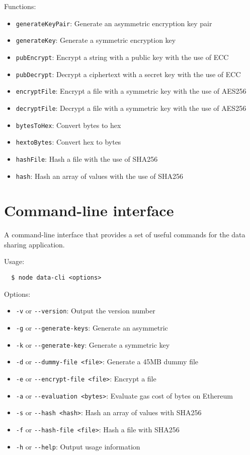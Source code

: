 Functions:

\begin{itemize}
  \item \verb|generateKeyPair|: Generate an asymmetric encryption key pair
  \item \verb|generateKey|: Generate a symmetric encryption key
  \item \verb|pubEncrypt|: Encrypt a string with a public key with the use of ECC
  \item \verb|pubDecrypt|: Decrypt a ciphertext with a secret key with the use of ECC
  \item \verb|encryptFile|: Encrypt a file with a symmetric key with the use of AES256
  \item \verb|decryptFile|: Decrypt a file with a symmetric key with the use of AES256
  \item \verb|bytesToHex|: Convert bytes to hex
  \item \verb|hextoBytes|: Convert hex to bytes
  \item \verb|hashFile|: Hash a file with the use of SHA256
  \item \verb|hash|: Hash an array of values with the use of SHA256
\end{itemize}

\section{Command-line interface}
\label{implemenation:cli}

A command-line interface that provides a set of useful commands for the data sharing application.

Usage:

\begin{verbatim}
  $ node data-cli <options>
\end{verbatim}

Options:

\begin{itemize}
  \item \verb|-v| or \verb|--version|: Output the version number
  \item \verb|-g| or \verb|--generate-keys|: Generate an asymmetric
  \item \verb|-k| or \verb|--generate-key|: Generate a symmetric key
  \item \verb|-d| or \verb|--dummy-file <file>|: Generate a 45MB dummy file
  \item \verb|-e| or \verb|--encrypt-file <file>|: Encrypt a file
  \item \verb|-a| or \verb|--evaluation <bytes>|: Evaluate gas cost of bytes on Ethereum
  \item \verb|-s| or \verb|--hash <hash>|: Hash an array of values with SHA256
  \item \verb|-f| or \verb|--hash-file <file>|: Hash a file with SHA256
  \item \verb|-h| or \verb|--help|: Output usage information
\end{itemize}

